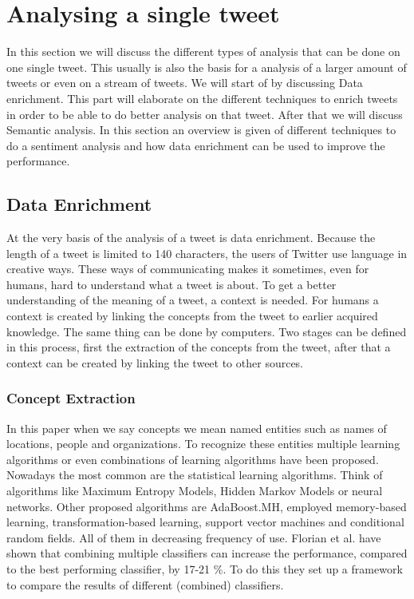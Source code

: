 \documentclass{article}
\begin{document}
\section*{Analysing a single tweet}

In this section we will discuss the different types of analysis that can be done on one single tweet. This usually is also the basis for a analysis of a larger amount of tweets or even on a stream of tweets. We will start of by discussing Data enrichment. This part will elaborate on the different techniques to enrich tweets in order to be able to do better analysis on that tweet. After that we will discuss Semantic analysis. In this section an overview is given of different techniques to do a sentiment analysis and how data enrichment can be used to improve the performance.
\subsection{Data Enrichment}
At the very basis of the analysis of a tweet is data enrichment. Because the length of a tweet is limited to 140 characters, the users of Twitter use language in creative ways. These ways of communicating makes it sometimes, even for humans, hard to understand what a tweet is about. To get a better understanding of the meaning of a tweet, a context is needed. For humans a context is created by linking the concepts from the tweet to earlier acquired knowledge. The same thing can be done by computers. Two stages can be defined in this process, first the extraction of the concepts from the tweet, after that a context can be created by linking the tweet to other sources.
\subsubsection*{Concept Extraction}
In this paper when we say concepts we mean named entities such as names of locations, people and organizations. To recognize these entities multiple learning algorithms or even combinations of learning algorithms have been proposed. Nowadays the most common are the statistical learning algorithms. Think of algorithms like Maximum Entropy Models, Hidden Markov Models or neural networks. Other proposed algorithms are AdaBoost.MH, employed memory-based learning, transformation-based learning, support vector machines and conditional random fields. All of them in decreasing frequency of use.\cite{EntityRecognition} Florian et al. have shown that combining multiple classifiers can increase the performance, compared to the best performing classifier, by 17-21 \%.\cite{ClassifierCombination} To do this they set up a framework to compare the results of different (combined) classifiers.  
\end{document}
